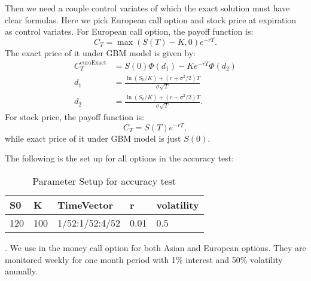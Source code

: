Then we need a couple control variates of which the exact solution must have clear formulas. 
Here we pick European call option and stock price at expiration as control variates.   
For European call option, the payoff function is: 
\[ C_{T} = \max (S(T)-K,0)e^{-rT}.\] 
The exact price of it under GBM model is given by:  
\begin{align*}
    C_{T}^{\mathrm{euroExact}} &= S(0)\Phi(d_1)-Ke^{-rT}\Phi(d_2)\\
    d_1 &=\frac{\ln(S_0/K)+(r+\sigma^2/2)T}{\sigma\sqrt{T}}\\
    d_2 &=\frac{\ln(S_0/K)+(r-\sigma^2/2)T}{\sigma\sqrt{T}}.
\end{align*}
For stock price, the payoff function is: 
\[ C_{T} = S(T)e^{-rT},\] 
while exact price of it under GBM model is just $S(0)$.  

The following is the set up for all options in the accuracy test:
\begin{table}[h]
    \centering
	\caption{Parameter Setup for accuracy test}
	\begin{tabular}{lllll}
		\hline\hline
        S0 & K & TimeVector & r & volatility \\[0.5ex]
        \hline
        120  & 100 & 1/52:1/52:4/52 & 0.01 & 0.5 \\[1ex] 
        \hline
	\end{tabular}
\end{table}.
We use in the money call option for both Asian and European options. 
They are monitored weekly for one month period with 1\% interest and 50\% volatility anunally. 

